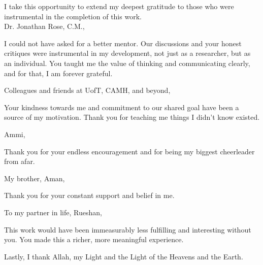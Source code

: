 \noindent I take this opportunity to extend my deepest gratitude to those who were instrumental in the completion of this work.\\

\noindent Dr. Jonathan Rose, C.M.,\vspace{-5pt}
\begin{addmargin}[1em]{2em}
	I could not have asked for a better mentor. Our discussions and your honest critiques were instrumental in my development, not just as a researcher, but as an individual. You taught me the value of thinking and communicating clearly, and for that, I am forever grateful.\\
\end{addmargin}

\noindent Colleagues and friends at UofT, CAMH, and beyond,\vspace{-5pt}
\begin{addmargin}[1em]{2em}
	\indent Your kindness towards me and commitment to our shared goal have been a source of my motivation. Thank you for teaching me things I didn't know existed.\\
\end{addmargin}

\noindent Ammi,\vspace{-5pt}
\begin{addmargin}[1em]{2em}
	Thank you for your endless encouragement and for being my biggest cheerleader from afar.\\
\end{addmargin}

\noindent My brother, Aman,\vspace{-5pt}
\begin{addmargin}[1em]{2em}
	Thank you for your constant support and belief in me.\\
\end{addmargin}


\noindent To my partner in life, Rueshan,\vspace{-5pt}
\begin{addmargin}[1em]{2em}
	\indent This work would have been immeasurably less fulfilling and interesting without you. You made this a richer, more meaningful experience.\\
\end{addmargin}

\noindent Lastly, I thank Allah, my Light and the Light of the Heavens and the Earth.